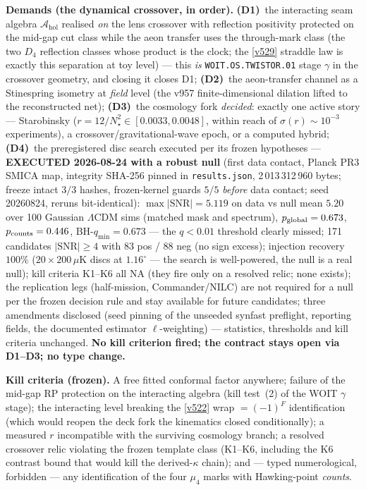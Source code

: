 \par\smallskip\noindent\textbf{Demands (the dynamical crossover, in order).}
\textbf{(D1)}~the interacting seam algebra $\mathcal A_{\mathrm{hol}}$ realised \emph{on} the lens
crossover with reflection positivity protected on the mid-gap cut class while the aeon transfer
uses the through-mark class (the two $D_4$ reflection classes whose product is the clock; the
\vref{v529} straddle law is exactly this separation at toy level) --- this \emph{is}
\texttt{WOIT.OS.TWISTOR.01} stage $\gamma$ in the crossover geometry, and closing it closes D1;
\textbf{(D2)}~the aeon-transfer channel as a Stinespring isometry at \emph{field} level (the v957
finite-dimensional dilation lifted to the reconstructed net); \textbf{(D3)}~the cosmology fork
\emph{decided}: exactly one active story --- Starobinsky ($r=12/N_\star^2\in[0.0033,0.0048]$,
within reach of $\sigma(r)\sim10^{-3}$ experiments), a crossover/gravitational-wave epoch, or a
computed hybrid; \textbf{(D4)}~the preregistered disc search executed per its frozen hypotheses ---
\textbf{EXECUTED 2026-08-24 with a robust null} (first data contact, Planck PR3 SMICA map,
integrity SHA-256 pinned in \texttt{results.json}, 2\,013\,312\,960 bytes; freeze intact $3/3$
hashes, frozen-kernel guards $5/5$ \emph{before} data contact; seed 20260824, reruns
bit-identical): $\max|\mathrm{SNR}| = 5.119$ on data vs null mean $5.20$ over 100 Gaussian
$\Lambda$CDM sims (matched mask and spectrum), $p_{\rm global} = 0.673$, $p_{\rm counts} = 0.446$,
BH-$q_{\min} = 0.673$ --- the $q < 0.01$ threshold clearly missed; 171 candidates $|\mathrm{SNR}|
\ge 4$ with $83$ pos / $88$ neg (no sign excess); injection recovery $100\%$ ($20 \times
200\,\mu$K discs at $1.16^\circ$ --- the search is well-powered, the null is a real null); kill
criteria K1--K6 all NA (they fire only on a resolved relic; none exists); the replication legs
(half-mission, Commander/NILC) are not required for a null per the frozen decision rule and stay
available for future candidates; three amendments disclosed (seed pinning of the unseeded
synfast preflight, reporting fields, the documented estimator $\ell$-weighting) --- statistics,
thresholds and kill criteria unchanged.  \textbf{No kill criterion fired; the contract stays
open via D1--D3; no type change.}

\par\smallskip\noindent\textbf{Kill criteria (frozen).}  A free fitted conformal factor anywhere;
failure of the mid-gap RP protection on the interacting algebra (kill test~(2) of the WOIT
$\gamma$ stage); the interacting level breaking the \vref{v522} wrap $=(-1)^F$ identification
(which would reopen the deck fork the kinematics closed conditionally); a measured $r$
incompatible with the surviving cosmology branch; a resolved crossover relic violating the frozen
template class (K1--K6, including the K6 contrast bound that would kill the derived-$\kappa$
chain); and --- typed numerological, forbidden --- any identification of the four $\mu_4$ marks
with Hawking-point \emph{counts}.

